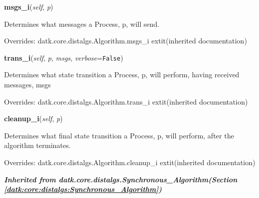     \vspace{0.5ex}

\hspace{.8\funcindent}\begin{boxedminipage}{\funcwidth}

    \raggedright \textbf{msgs\_i}(\textit{self}, \textit{p})

\setlength{\parskip}{2ex}
    Determines what messages a Process, p, will send.

\setlength{\parskip}{1ex}
      Overrides: datk.core.distalgs.Algorithm.msgs\_i 	extit{(inherited documentation)}

    \end{boxedminipage}

    \vspace{0.5ex}

\hspace{.8\funcindent}\begin{boxedminipage}{\funcwidth}

    \raggedright \textbf{trans\_i}(\textit{self}, \textit{p}, \textit{msgs}, \textit{verbose}={\tt False})

\setlength{\parskip}{2ex}
    Determines what state transition a Process, p, will perform, having 
    received messages, msgs

\setlength{\parskip}{1ex}
      Overrides: datk.core.distalgs.Algorithm.trans\_i 	extit{(inherited documentation)}

    \end{boxedminipage}

    \vspace{0.5ex}

\hspace{.8\funcindent}\begin{boxedminipage}{\funcwidth}

    \raggedright \textbf{cleanup\_i}(\textit{self}, \textit{p})

\setlength{\parskip}{2ex}
    Determines what final state transition a Process, p, will perform, 
    after the algorithm terminates.

\setlength{\parskip}{1ex}
      Overrides: datk.core.distalgs.Algorithm.cleanup\_i 	extit{(inherited documentation)}

    \end{boxedminipage}


\large{\textbf{\textit{Inherited from datk.core.distalgs.Synchronous\_Algorithm\textit{(Section \ref{datk:core:distalgs:Synchronous_Algorithm})}}}}

